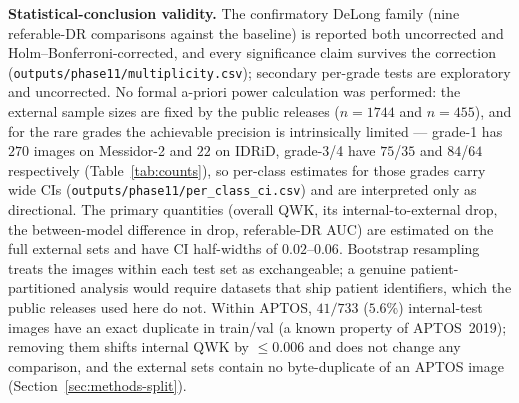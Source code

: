 \documentclass[journal]{IEEEtran}
\begin{document}
\textbf{Statistical-conclusion validity.} The confirmatory DeLong family (nine
referable-DR comparisons against the baseline) is reported both uncorrected and
Holm--Bonferroni-corrected, and every significance claim survives the correction
(\texttt{outputs/phase11/multiplicity.csv}); secondary per-grade tests are
exploratory and uncorrected. No formal a-priori power calculation was performed:
the external sample sizes are fixed by the public releases ($n=1744$ and $n=455$),
and for the rare grades the achievable precision is intrinsically limited ---
grade-1 has $270$ images on Messidor-2 and $22$ on IDRiD, grade-3/4 have $75$/$35$
and $84$/$64$ respectively (Table~\ref{tab:counts}), so per-class estimates for
those grades carry wide CIs (\texttt{outputs/phase11/per\_class\_ci.csv}) and are
interpreted only as directional. The primary quantities (overall QWK, its
internal-to-external drop, the between-model difference in drop, referable-DR
AUC) are estimated on the full external sets and have CI half-widths of
$0.02$--$0.06$. Bootstrap resampling treats the images within each test set as
exchangeable; a genuine patient-partitioned analysis would require datasets that
ship patient identifiers, which the public releases used here do not. Within
APTOS, $41/733$ ($5.6\%$) internal-test images have an exact duplicate in
train/val (a known property of APTOS~2019); removing them shifts internal QWK by
$\leq 0.006$ and does not change any comparison, and the external sets contain no
byte-duplicate of an APTOS image (Section~\ref{sec:methods-split}).
\end{document}
